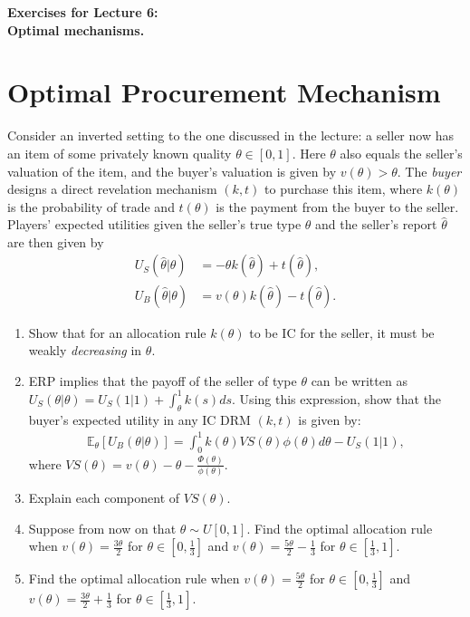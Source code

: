 \documentclass[a4paper]{article}
\begin{document}
\begin{center}
		\LARGE\textbf{Exercises for Lecture 6:\\ Optimal mechanisms.}
\end{center}







\section{Optimal Procurement Mechanism}
	Consider an inverted setting to the one discussed in the lecture: a seller now has an item of some privately known quality $\theta \in [0,1]$. Here $\theta$ also equals the seller's valuation of the item, and the buyer's valuation is given by $v(\theta) > \theta$. The \emph{buyer} designs a direct revelation mechanism $(k,t)$ to purchase this item, where $k(\theta)$ is the probability of trade and $t(\theta)$ is the payment from the buyer to the seller. Players' expected utilities given the seller's true type $\theta$ and the seller's report $\hat{\theta}$ are then given by
	\begin{align*}
		U_S(\hat{\theta}|\theta) &= -\theta k(\hat{\theta}) + t(\hat{\theta}),
		\\
		U_B(\hat{\theta}|\theta) &= v(\theta) k(\hat{\theta}) - t(\hat{\theta}).
	\end{align*}
	\begin{enumerate}
		\item Show that for an allocation rule $k(\theta)$ to be IC for the seller, it must be weakly \emph{decreasing} in $\theta$.
		\item ERP implies that the payoff of the seller of type $\theta$ can be written as $U_S(\theta|\theta) = U_S(1|1) + \int_{\theta}^{1} k(s) ds $. Using this expression, show that the buyer's expected utility in any IC DRM $(k,t)$ is given by:
		\begin{align*}
			\mathbb{E}_\theta [ U_B(\theta | \theta) ] = \int_0^1 k(\theta) VS(\theta) \phi(\theta) d\theta - U_S(1|1),
		\end{align*}
		where $VS(\theta) = v(\theta) - \theta - \frac{\Phi(\theta)}{\phi(\theta)}$.
		\item Explain each component of $VS(\theta)$.
		\item Suppose from now on that $\theta \sim U[0,1]$. Find the optimal allocation rule when $v(\theta) = \frac{3\theta}{2}$ for $\theta \in [0,\frac{1}{3}]$ and $v(\theta) = \frac{5\theta}{2}-\frac{1}{3}$ for $\theta \in [\frac{1}{3},1]$.
		\item Find the optimal allocation rule when $v(\theta) = \frac{5\theta}{2}$ for $\theta \in [0,\frac{1}{3}]$ and $v(\theta) = \frac{3\theta}{2}+\frac{1}{3}$ for $\theta \in [\frac{1}{3},1]$.
	\end{enumerate}
		
\end{document}
